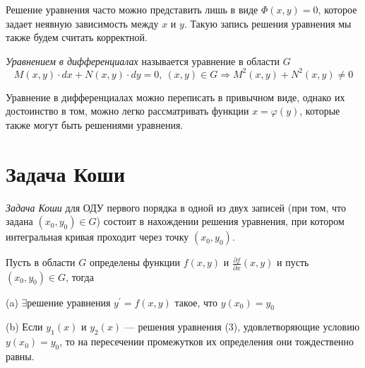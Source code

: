 \begin{remark*}
Решение уравнения часто можно представить лишь в виде $\Phi(x,y)=0$,
которое задает неявную зависимость между $x$ и $y$. Такую запись
решения уравнения мы также будем считать корректной.\end{remark*}
\begin{define*}
\emph{Уравнением в дифференциалах} называется уравнение в области
$G$ 
\[
M(x,y)\cdot dx+N(x,y)\cdot dy=0,\ \left(x,y\right)\in G\Rightarrow M^{2}(x,y)+N^{2}(x,y)\ne0
\]
\end{define*}
\begin{remark*}
Уравнение в дифференциалах можно переписать в привычном виде, однако
их достоинство в том, можно легко рассматривать функции $x=\varphi(y)$,
которые также могут быть решениями уравнения.
\end{remark*}

\section{Задача Коши}
\begin{define*}
\emph{Задача Коши} для ОДУ первого порядка в одной из двух записей
(при том, что задана $\left(x_{0},y_{0}\right)\in G$) состоит в нахождении
решения уравнения, при котором интегральная кривая проходит через
точку $\left(x_{0},y_{0}\right)$.\end{define*}
\begin{Th}
Пусть в области $G$ определены функции $f(x,y)$ и $\frac{\partial f}{\partial x}(x,y)$
и пусть $\left(x_{0},y_{0}\right)\in G$, тогда

(a) $\exists$решение уравнения $y^{\prime}=f(x,y)$ такое, что $y(x_{0})=y_{0}$

(b) Если $y_{1}(x)$ и $y_{2}(x)$ --- решения уравнения (3), удовлетворяющие
условию $y(x_{0})=y_{0}$, то на пересечении промежутков их определения
они тождественно равны.
\end{Th}

